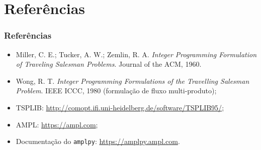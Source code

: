 \documentclass[fleqn]{beamer}
\begin{document}
\section{Referências}

\begin{frame}
	\frametitle{Referências}
	\begin{itemize}
		\item Miller, C. E.; Tucker, A. W.; Zemlin, R. A. \emph{Integer
			Programming Formulation of Traveling Salesman Problems}.
			Journal of the ACM, 1960.
		\item Wong, R. T. \emph{Integer Programming Formulations of the
			Travelling Salesman Problem}. IEEE ICCC, 1980 (formulação de
			fluxo multi-produto);
		\item TSPLIB:
			\url{http://comopt.ifi.uni-heidelberg.de/software/TSPLIB95/};
		\item AMPL: \url{https://ampl.com};
		\item Documentação do \texttt{amplpy}: \url{https://amplpy.ampl.com}.
	\end{itemize}
\end{frame}
\end{document}
